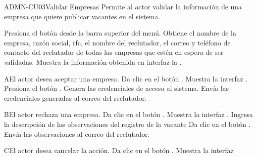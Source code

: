 \begin{UseCase}{ADMN-CU03}{Validar Empresas}{
	Permite al actor validar la información de una empresa que quiere publicar vacantes en el sistema.
}
	  

\end{UseCase}

\begin{UCtrayectoria}
	\UCpaso [\UCactor] Presiona el botón  desde la barra superior del menú.
	\UCpaso [\UCsist] Obtiene el nombre de la empresa, razón social, rfc, el nombre del reclutador, el correo y teléfono de contacto del reclutador de todas las empresas que estén en espera de ser validadas. 
    \UCpaso [\UCsist] Muestra la información obtenida en interfaz la .
\end{UCtrayectoria}

\begin{UCtrayectoriaA}{A}{El actor desea aceptar una empresa.}
	\UCpaso [\UCactor] Da clic en el botón .
	\UCpaso [\UCsist] Muestra la interfaz .
	\UCpaso [\UCsist] Presiona el botón .
	\UCpaso [\UCsist] Genera las credenciales de acceso al sistema.
	\UCpaso [\UCsist] Envía las credenciales generadas al correo del reclutador.
\end{UCtrayectoriaA} 

\begin{UCtrayectoriaA}{B}{El actor rechaza una empresa.}
	\UCpaso [\UCactor] Da clic en el botón .
	\UCpaso [\UCsist] Muestra la interfaz .
	\UCpaso [\UCactor] Ingresa la descripción de las observaciones del registro de la vacante
	\UCpaso [\UCactor] Da clic en el botón .
	\UCpaso [\UCsist] Envía las observaciones al correo del reclutador.
\end{UCtrayectoriaA} 

\begin{UCtrayectoriaA}{C}{El actor desea cancelar la acción.}
	\UCpaso [\UCactor] Da clic en el botón .
	\UCpaso [\UCsist] Muestra la interfaz 
\end{UCtrayectoriaA} 


